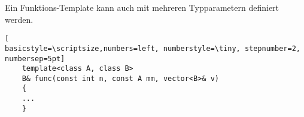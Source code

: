 Ein Funktions-Template kann auch mit mehreren Typparametern definiert werden.
\begin{lstlisting}[
basicstyle=\scriptsize,numbers=left, numberstyle=\tiny, stepnumber=2, numbersep=5pt]
    template<class A, class B>
    B& func(const int n, const A mm, vector<B>& v)
    {
    ...
    }
\end{lstlisting}
%


%
